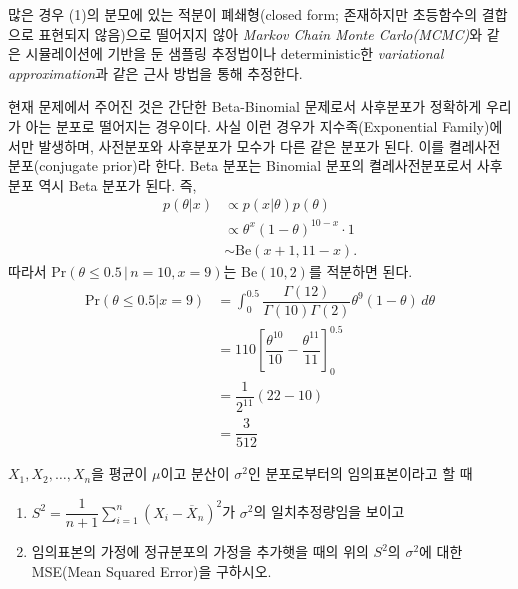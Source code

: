 \documentclass[answers]{exam}
\begin{document}
\begin{questions}
\begin{solution}
\begin{enumerate}
         많은 경우 (1)의 분모에 있는 적분이 폐쇄형(closed form; 존재하지만 초등함수의 결합으로 표현되지 않음)으로 떨어지지 않아 \emph{Markov Chain Monte Carlo(MCMC)}와 같은 시뮬레이션에 기반을 둔 샘플링 추정법이나 deterministic한 \emph{variational approximation}과 같은 근사 방법을 통해 추정한다.\par
         현재 문제에서 주어진 것은 간단한 Beta-Binomial 문제로서 사후분포가 정확하게 우리가 아는 분포로 떨어지는 경우이다. 사실 이런 경우가 지수족(Exponential Family)에서만 발생하며, 사전분포와 사후분포가 모수가 다른 같은 분포가 된다. 이를 켤레사전분포(conjugate prior)라 한다. Beta 분포는 Binomial 분포의 켤레사전분포로서 사후분포 역시 Beta 분포가 된다. 즉,
         \begin{align}
          p\left(\theta|x\right) &\propto p\left(x|\theta\right)p\left(\theta\right)\\
          &\propto \theta^{x}\left(1-\theta\right)^{10-x}\cdot 1\\
          &\sim \mathrm{Be}\left(x+1,11-x\right).
         \end{align}
         따라서 $\mathrm{Pr}\left(\theta\leq0.5\,|\,n=10,x=9\right)$는 $\mathrm{Be}\left(10,2\right)$를 적분하면 된다.
         \begin{align}
          \mathrm{Pr}\left(\theta\leq 0.5|x=9\right) &= \int_{0}^{0.5}\dfrac{\Gamma\left(12\right)}{\Gamma\left(10\right)\Gamma\left(2\right)}\theta^{9}\left(1-\theta\right)\,d\theta\\
          &= 110\left[\dfrac{\theta^{10}}{10}-\dfrac{\theta^{11}}{11} \right]_{0}^{0.5}\\
          &= \dfrac{1}{2^{11}}\left(22-10\right)\\
          &= \dfrac{3}{512}
         \end{align}
      \end{enumerate}
   \end{solution}
   \question
   $X_{1},X_{2},\ldots, X_{n}$을 평균이 $\mu$이고 분산이 $\sigma^{2}$인 분포로부터의 임의표본이라고 할 때
   \begin{enumerate}
    \item $S^{2}=\dfrac{1}{n+1}\displaystyle \sum_{i=1}^{n}\left(X_{i}-\overline{X}_{n}\right)^{2}$가 $\sigma^{2}$의 일치추정량임을 보이고
    \item 임의표본의 가정에 정규분포의 가정을 추가햇을 때의 위의 $S^{2}$의 $\sigma^{2}$에 대한 MSE(Mean Squared Error)을 구하시오.
   \end{enumerate}
   \begin{solution}
    \begin{enumerate}

\end{enumerate}
\end{solution}
\end{questions}
\end{document}
